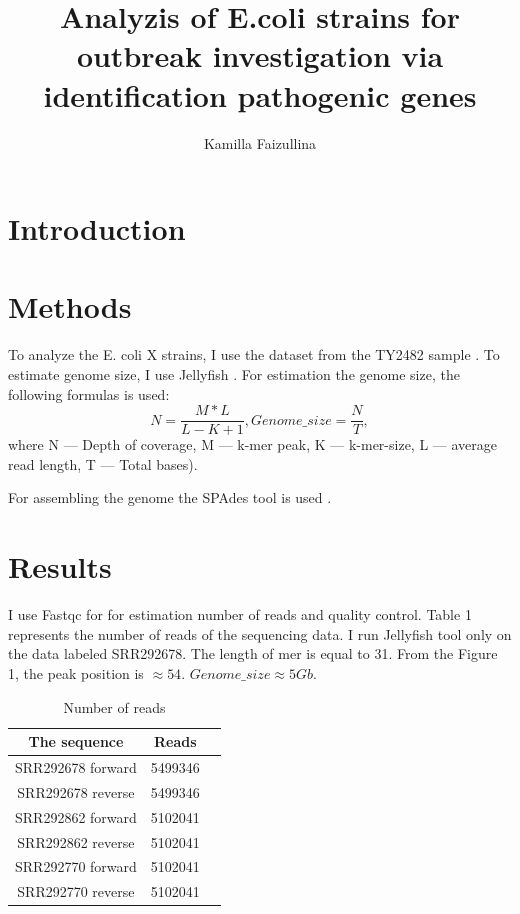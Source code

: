 \documentclass{article}
\title{ Analyzis of E.coli strains for outbreak investigation via identification pathogenic genes    }
\author{ Kamilla Faizullina}
\date{\empty}
\begin{document}
\maketitle
\section{Introduction}
\section{Methods}
To analyze the E. coli X strains, I use the dataset from the TY2482 sample \cite{data}. To estimate genome size, I use Jellyfish \cite{jellyfish}. For estimation the genome size, the following formulas is used: 
$$ N = \frac{M*L}{L-K+1}, Genome\_size = \frac{N}{T}, $$
where N --- Depth of coverage, M --- k-mer peak, K --- k-mer-size, L --- average read length, T --- Total bases).

For assembling the genome the SPAdes tool is used \cite {spades}.

 


\section{Results}
I use Fastqc for \cite{fc} for estimation number of reads and quality control. Table 1 represents the number of reads of the sequencing data.  
I run Jellyfish tool only on the data labeled SRR292678. The length of mer is equal to 31. From the Figure 1, the peak position is $\approx 54$. $Genome\_size \approx 5 Gb$. %
	\begin{table} 
	\centering
	\begin{tabular}{|c|c|c|}
		\hline
		The sequence & Reads \\
		\hline
		SRR292678 forward  &  5499346  \\
		\hline
		SRR292678 reverse &  5499346 \\
		\hline
		SRR292862 forward &  5102041 \\
		\hline
		SRR292862 reverse &  5102041 \\
		\hline
		SRR292770 forward  &  5102041 \\
		\hline
		SRR292770 reverse &   5102041  \\
		\hline
	\end{tabular}
	\caption{  Number of reads }
\end{table}
\end{document}
